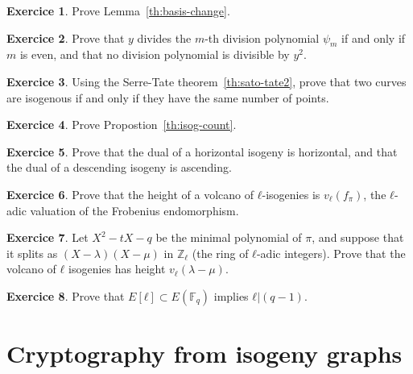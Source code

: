 \documentclass[10pt]{article}
\theoremstyle{plain}
\theoremstyle{definition}
\newtheorem{exercice}{Exercice}[part]
\def\F{\ensuremath{\mathbb{F}}}
\begin{document}
\begin{exercice}
  Prove Lemma~\ref{th:basis-change}.
\end{exercice}

\begin{exercice}
  Prove that $y$ divides the $m$-th division polynomial $ψ_m$ if and
  only if $m$ is even, and that no division polynomial is divisible by
  $y^2$.
\end{exercice}

\begin{exercice}
  Using the Serre-Tate theorem~\ref{th:sato-tate2}, prove that two
  curves are isogenous if and only if they have the same number of
  points.
\end{exercice}

\begin{exercice}
  Prove Propostion~\ref{th:isog-count}.
\end{exercice}

\begin{exercice}
  Prove that the dual of a horizontal isogeny is horizontal, and that
  the dual of a descending isogeny is ascending.
\end{exercice}

\begin{exercice}
  Prove that the height of a volcano of $ℓ$-isogenies is $v_ℓ(f_π)$,
  the $ℓ$-adic valuation of the Frobenius endomorphism.
\end{exercice}

\begin{exercice}
  Let $X^2-tX-q$ be the minimal polynomial of $π$, and suppose that it
  splits as $(X-λ)(X-μ)$ in $ℤ_ℓ$ (the ring of $ℓ$-adic integers). %
  Prove that the volcano of $ℓ$ isogenies has height $v_ℓ(λ-μ)$.
\end{exercice}

\begin{exercice}
  \label{ex:group-struct}
  Prove that $E[ℓ]⊂E(\F_q)$ implies $ℓ|(q-1)$.
\end{exercice}


\clearpage
\part{Cryptography from isogeny graphs }

\end{document}

